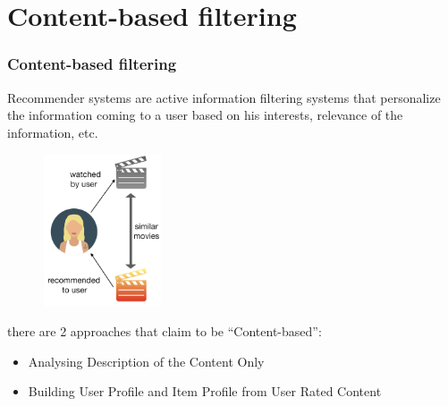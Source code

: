 \section[Content-based filtering]{Content-based filtering}
\begin{frame}
	\frametitle{Content-based filtering}
    	Recommender systems are active information filtering systems that personalize the information coming to a user based on his interests, relevance of the information, etc. 
        \begin{figure}
            \includegraphics[height=4.5cm,width=3.5cm]{figures/Content-based.png}
		\end{figure}
	\newpage
	there are 2 approaches that claim to be “Content-based”:
	\begin{itemize}
	    \item Analysing Description of the Content Only
	    \item Building User Profile and Item Profile from User Rated Content
	\end{itemize}
\end{frame}

